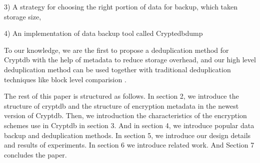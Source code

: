 3) A strategy for choosing the right portion of data for backup, which taken storage size, 

4) An implementation of data backup tool called Cryptedbdump 

To our knowledge, we are the first to propose a deduplication method for Cryptdb with the help of metadata to reduce storage overhead, and our high level deduplication method can be used together with traditional deduplication techniques like block level comparision \citep{bellare2013message}.

The rest of this paper is structured as follows. In section 2, we introduce the structure of cryptdb and the structure of encryption metadata in the newest version of Cryptdb. Then, we introduction the characteristics of the encryption schemes use in Cryptdb in section 3. And in section 4, we introduce popular data backup and deduplication methods. In section 5, we introduce our design details and results of experiments. In section 6 we introduce related work. And Section 7 concludes the paper.
\\ \\ \\ 



